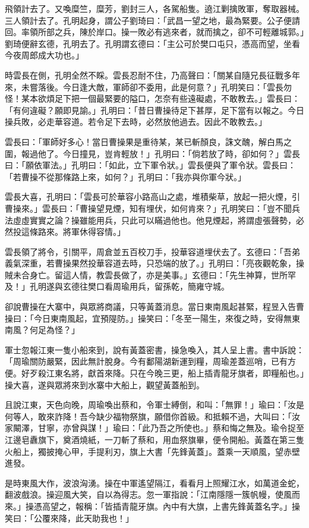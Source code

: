 飛領計去了。又喚糜竺，糜芳，劉封三人，各駕船隻。遶江剿擒敗軍，奪取器械。三人領計去了。孔明起身，謂公子劉琦曰：「武昌一望之地，最為緊要。公子便請回。率領所部之兵，陳於岸口。操一敗必有逃來者，就而擒之，卻不可輕離城郭。」劉琦便辭玄德，孔明去了。孔明謂玄德曰：「主公可於樊口屯只，憑高而望，坐看今夜周郎成大功也。」

時雲長在側，孔明全然不睬。雲長忍耐不住，乃高聲曰：「關某自隨兄長征戰多年來，未嘗落後。今日逢大敵，軍師卻不委用，此是何意？」孔明笑曰：「雲長勿怪！某本欲煩足下把一個最緊要的隘口，怎奈有些遠礙處，不敢教去。」雲長曰：「有何違礙？願即見諭。」孔明曰：「昔日曹操待足下甚厚，足下當有以報之。今日操兵敗，必走華容道。若令足下去時，必然放他過去。因此不敢教去。」

雲長曰：「軍師好多心！當日曹操果是重待某，某已斬顏良，誅文醜，解白馬之圍，報過他了。今日撞見，豈肯輕放！」孔明曰：「倘若放了時，卻如何？」雲長曰：「願依軍法。」孔明曰：「如此，立下軍令狀。」雲長便與了軍令狀。雲長曰：「若曹操不從那條路上來，如何？」孔明曰：「我亦與你軍今狀。」

雲長大喜，孔明曰：「雲長可於華容小路高山之處，堆積柴草，放起一把火煙，引曹操來。」雲長曰：「曹操望見煙，知有埋伏，如何肯來？」孔明笑曰：「豈不聞兵法虛虛實實之論？操雖能用兵，只此可以瞞過他也。他見煙起，將謂虛張聲勢，必然投這條路來。將軍休得容情。」

雲長領了將令，引關平，周倉並五百校刀手，投華容道埋伏去了。玄德曰：「吾弟義氣深重，若曹操果然投華容道去時，只恐端的放了。」孔明曰：「亮夜觀乾象，操賊未合身亡。留這人情，教雲長做了，亦是美事。」玄德曰：「先生神算，世所罕及！」孔明遂與玄德往樊口看周瑜用兵，留孫乾，簡雍守城。

卻說曹操在大寨中，與眾將商議，只等黃蓋消息。當日東南風起甚緊，程昱入告曹操曰：「今日東南風起，宜預隄防。」操笑曰：「冬至一陽生，來復之時，安得無東南風？何足為怪？」

軍士忽報江東一隻小船來到，說有黃蓋密書，操急喚入，其人呈上書。書中訴說：「周瑜關防嚴緊，因此無計脫身。今有鄱陽湖新運到糧，周瑜差蓋巡哨，已有方便。好歹殺江東名將，獻首來降。只在今晚三更，船上插青龍牙旗者，即糧船也。」操大喜，遂與眾將來到水寨中大船上，觀望黃蓋船到。

且說江東，天色向晚，周瑜喚出蔡和，令軍士縛倒，和叫：「無罪！」瑜曰：「汝是何等人，敢來詐降！吾今缺少福物祭旗，願借你首級。和抵賴不過，大叫曰：「汝家闞澤，甘寧，亦曾與謀！」瑜曰：「此乃吾之所使也。」蔡和悔之無及。瑜令捉至江邊皂纛旗下，奠酒燒紙，一刀斬了蔡和，用血祭旗畢，便令開船。黃蓋在第三隻火船上，獨披掩心甲，手提利刃，旗上大書「先鋒黃蓋」。蓋乘一天順風，望赤壁進發。

是時東風大作，波浪洶湧。操在中軍遙望隔江，看看月上照耀江水，如萬道金蛇，翻波戲浪。操迎風大笑，自以為得志。忽一軍指說：「江南隱隱一簇帆幔，使風而來。」操憑高望之，報稱：「皆插青龍牙旗。內中有大旗，上書先鋒黃蓋名字。」操笑曰：「公覆來降，此天助我也！」

